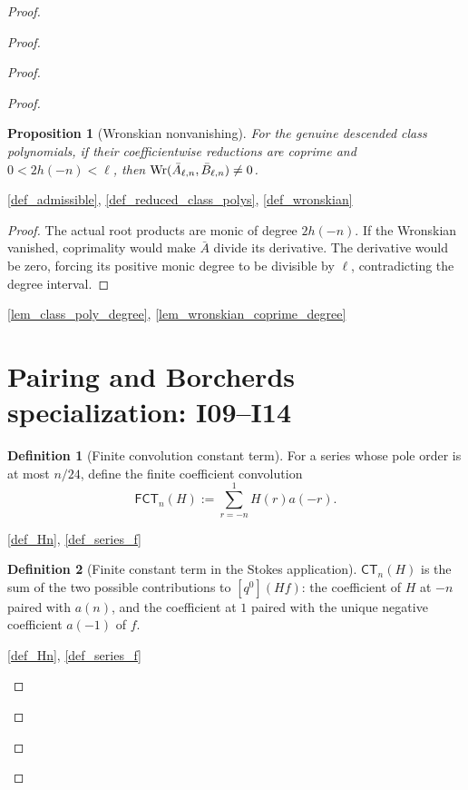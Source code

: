 \documentclass[11pt,a4paper]{article}
\numberwithin{equation}{section}
\theoremstyle{plain}\newtheorem{theorem}{Theorem}[section]\newaliascnt{proposition}{theorem}\newtheorem{proposition}[proposition]{Proposition}\aliascntresetthe{proposition}\newaliascnt{lemma}{theorem}\newtheorem{lemma}[lemma]{Lemma}\aliascntresetthe{lemma}
\theoremstyle{definition}\newaliascnt{definition}{theorem}\newtheorem{definition}[definition]{Definition}\aliascntresetthe{definition}\newaliascnt{notation}{theorem}\newtheorem{notation}[notation]{Notation}\aliascntresetthe{notation}
\providecommand{\lean}[1]{}\providecommand{\leanok}{}
\begin{document}
\begin{proof}
\begin{proof}
\begin{proof}
\begin{proof}
\begin{proposition}[Wronskian nonvanishing]\label{prop_W_nonzero}\lean{SptCM.Repair.actualClassPolynomials_wronskian_ne_zero}\leanok
For the genuine descended class polynomials, if their coefficientwise
reductions are coprime and $0<2h(-n)<\ell$, then
$\operatorname{Wr}(\bar A_{\ell,n},\bar B_{\ell,n})\ne0$.
\end{proposition}
\begin{uses-statement}\ref{def_admissible}, \ref{def_reduced_class_polys}, \ref{def_wronskian}\end{uses-statement}
\begin{proof}
The actual root products are monic of degree $2h(-n)$.  If the Wronskian
vanished, coprimality would make $\bar A$ divide its derivative.  The
derivative would be zero, forcing its positive monic degree to be divisible
by $\ell$, contradicting the degree interval.
\end{proof}
\begin{uses-proof}\ref{lem_class_poly_degree}, \ref{lem_wronskian_coprime_degree}\end{uses-proof}


\section{Pairing and Borcherds specialization: I09--I14}
\begin{definition}[Finite convolution constant term]\label{def_i09_finite_product_constant_term}\lean{SptCM.Analytic.Repaired.finiteMockProductConstantTerm}\leanok
For a series whose pole order is at most \(n/24\), define the finite
coefficient convolution
\[
 \mathsf{FCT}_{n}(H):=\sum_{r=-n}^{1} H(r)a(-r).
\]
\end{definition}
\begin{uses-statement}\ref{def_Hn}, \ref{def_series_f}\end{uses-statement}

\begin{definition}[Finite constant term in the Stokes application]\label{def_i09_mock_product_constant_term}\lean{SptCM.Analytic.Repaired.hnMockProductConstantTerm}\leanok
\(\mathsf{CT}_{n}(H)\) is the sum of the two possible contributions to
\([q^0](Hf)\): the coefficient of \(H\) at \(-n\) paired with \(a(n)\),
and the coefficient at \(1\) paired with the unique negative coefficient
\(a(-1)\) of \(f\).
\end{definition}
\begin{uses-statement}\ref{def_Hn}, \ref{def_series_f}\end{uses-statement}


\end{proof}
\end{proof}
\end{proof}
\end{proof}
\end{document}
